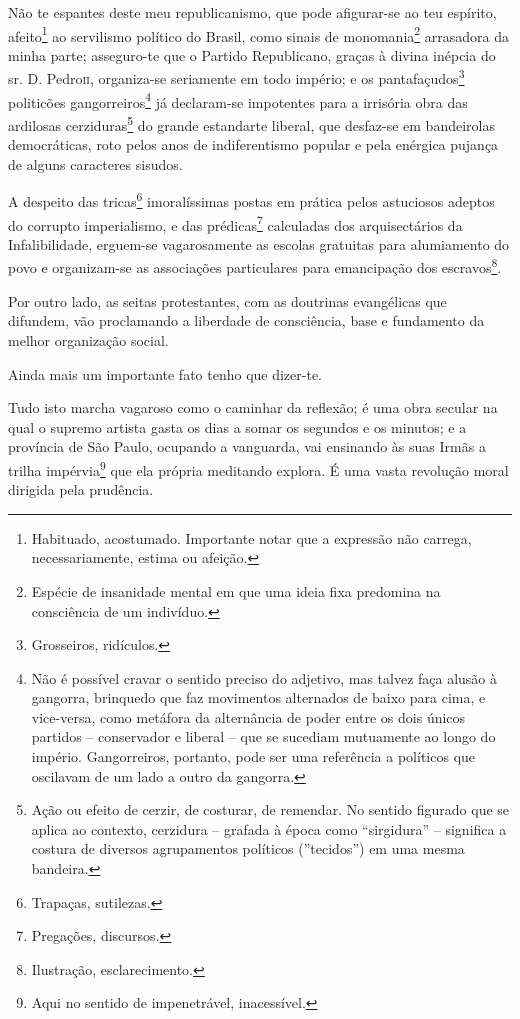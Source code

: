{Não te espantes deste meu republicanismo, que pode afigurar-se ao teu
espírito, afeito\footnote{ Habituado, acostumado. Importante notar que
  a expressão não carrega, necessariamente, estima ou afeição.} ao
servilismo político do Brasil, como sinais de {monomania}\footnote{
  Espécie de insanidade mental em que uma ideia fixa predomina na
  consciência de um indivíduo.} {arrasadora} da minha parte; asseguro-te
que o Partido Republicano, graças à divina inépcia do sr. D. Pedro\textsc{ii},
organiza-se seriamente em todo império; e os pantafaçudos\footnote{
  Grosseiros, ridículos.} politicões gangorreiros\footnote{ Não é
  possível cravar o sentido preciso do adjetivo, mas talvez faça alusão
  à gangorra, brinquedo que faz movimentos alternados de baixo para
  cima, e vice-versa, como metáfora da alternância de poder entre os
  dois únicos partidos -- conservador e liberal -- que se sucediam
  mutuamente ao longo do império. Gangorreiros, portanto, pode ser uma
  referência a políticos que oscilavam de um lado a outro da gangorra.}
já declaram-se impotentes para a irrisória obra das ardilosas
cerziduras\footnote{ Ação ou efeito de cerzir, de costurar, de
  remendar. No sentido figurado que se aplica ao contexto, cerzidura --
  grafada à época como ``sirgidura'' -- significa a costura de diversos
  agrupamentos políticos (''tecidos'') em uma mesma bandeira.} do g{rande
estandarte liberal}, que desfaz-se em bandeirolas democráticas, roto
pelos anos de indiferentismo popular e pela enérgica pujança de alguns
caracteres sisudos.

A despeito das tricas\footnote{ Trapaças, sutilezas.} imoralíssimas
postas em prática pelos astuciosos adeptos do corrupto imperialismo, e
das prédicas\footnote{ Pregações, discursos.} calculadas dos
arquisectários da {Infalibilidade}, erguem-se vagarosamente as escolas
gratuitas para alumiamento do povo e organizam-se as associações
particulares para emancipação dos escravos\footnote{ Ilustração,
  esclarecimento.}.

Por outro lado, as seitas protestantes, com as doutrinas evangélicas que
difundem, vão proclamando a liberdade de consciência, base e fundamento
da melhor organização social.

Ainda mais um importante fato tenho que dizer-te.

Tudo isto marcha vagaroso como o caminhar da reflexão; é uma obra
secular na qual o {supremo artista} gasta os dias a somar os segundos e
os minutos; e a província de São Paulo, ocupando a vanguarda, vai
ensinando às suas Irmãs a trilha impérvia\footnote{ Aqui no sentido de
  impenetrável, inacessível.} que ela própria meditando explora. É uma
vasta revolução moral dirigida pela prudência.

}
